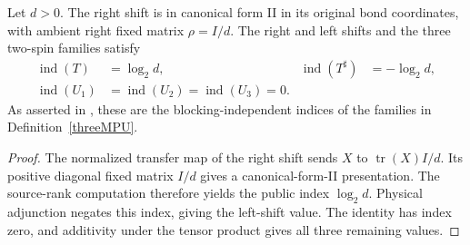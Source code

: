 \begin{lemma}
    \label{thm:mpu_shift_public_index_values}
    \leanok
    Let $d>0$. The right shift is in canonical form II in its original bond
    coordinates, with ambient right fixed matrix $\rho=I/d$. The right and
    left shifts and the three two-spin families satisfy
    \begin{align}
        \operatorname{ind}(T)        & =\log_2 d,               &
        \operatorname{ind}(T^\sharp) & =-\log_2 d,                \\
        \operatorname{ind}(U_1)      & =\operatorname{ind}(U_2)
        =\operatorname{ind}(U_3)=0.
    \end{align}
    As asserted in \cite{Cirac2017MPU}, these are the blocking-independent indices of the families in
    Definition~\ref{threeMPU}.
\end{lemma}

\begin{proof}\leanok
    The normalized transfer map of the right shift sends $X$ to
    $\operatorname{tr}(X)I/d$. Its positive diagonal fixed matrix $I/d$
    gives a canonical-form-II presentation. The source-rank computation
    therefore yields the public index $\log_2 d$. Physical adjunction negates
    this index, giving the left-shift value. The identity has index zero,
    and additivity under the tensor product gives all three remaining values.
\end{proof}

